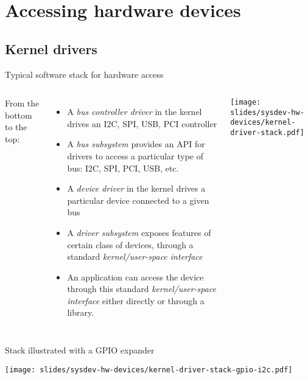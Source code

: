\section{Accessing hardware devices}

\subsection{Kernel drivers}

\begin{frame}{Typical software stack for hardware access}
  \begin{columns}
    From the bottom to the top:
    \begin{itemize}
    \item A {\em bus controller driver} in the kernel drives an I2C,
      SPI, USB, PCI controller
    \item A {\em bus subsystem} provides an API for drivers to access
      a particular type of bus: I2C, SPI, PCI, USB, etc.
    \item A {\em device driver} in the kernel drives a particular
      device connected to a given bus
    \item A {\em driver subsystem} exposes features of certain class
      of devices, through a standard {\em kernel/user-space interface}
    \item An application can access the device through this standard {\em
        kernel/user-space interface} either directly or through a
      library.
    \end{itemize}
    \begin{center}
      \texttt{[image: slides/sysdev-hw-devices/kernel-driver-stack.pdf]}
    \end{center}
  \end{columns}
\end{frame}

\begin{frame}{Stack illustrated with a GPIO expander}
  \begin{center}
    \texttt{[image: slides/sysdev-hw-devices/kernel-driver-stack-gpio-i2c.pdf]}
  \end{center}
\end{frame}

